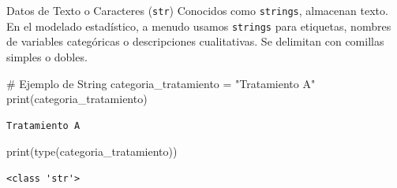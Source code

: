 \documentclass[
  ignorenonframetext,
  aspectratio=169,
  spanish,
]{beamer}
\newenvironment{Shaded}{\begin{snugshade}}{\end{snugshade}}
\newcommand{\BuiltInTok}[1]{\textcolor[rgb]{0.00,0.23,0.31}{#1}}
\newcommand{\CommentTok}[1]{\textcolor[rgb]{0.37,0.37,0.37}{#1}}
\newcommand{\NormalTok}[1]{\textcolor[rgb]{0.00,0.23,0.31}{#1}}
\newcommand{\OperatorTok}[1]{\textcolor[rgb]{0.37,0.37,0.37}{#1}}
\newcommand{\StringTok}[1]{\textcolor[rgb]{0.13,0.47,0.30}{#1}}
\begin{document}
\begin{frame}[fragile]{Datos de Texto o Caracteres (\texttt{str})}
\label{datos-de-texto-o-caracteres-str}
Conocidos como \texttt{strings}, almacenan texto. En el modelado
estadístico, a menudo usamos \texttt{strings} para etiquetas, nombres de
variables categóricas o descripciones cualitativas. Se delimitan con
comillas simples o dobles.

\begin{Shaded}
\begin{Highlighting}[]
\CommentTok{\# Ejemplo de String}
\NormalTok{categoria\_tratamiento }\OperatorTok{=} \StringTok{"Tratamiento A"}
\BuiltInTok{print}\NormalTok{(categoria\_tratamiento)}
\end{Highlighting}
\end{Shaded}

\begin{verbatim}
Tratamiento A
\end{verbatim}

\begin{Shaded}
\begin{Highlighting}[]
\BuiltInTok{print}\NormalTok{(}\BuiltInTok{type}\NormalTok{(categoria\_tratamiento))}
\end{Highlighting}
\end{Shaded}

\begin{verbatim}
<class 'str'>
\end{verbatim}
\end{frame}
\end{document}
